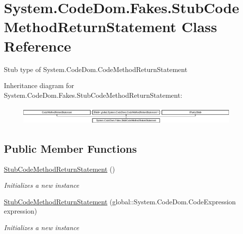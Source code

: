 \hypertarget{class_system_1_1_code_dom_1_1_fakes_1_1_stub_code_method_return_statement}{\section{System.\-Code\-Dom.\-Fakes.\-Stub\-Code\-Method\-Return\-Statement Class Reference}
\label{class_system_1_1_code_dom_1_1_fakes_1_1_stub_code_method_return_statement}
}


Stub type of System.\-Code\-Dom.\-Code\-Method\-Return\-Statement 


Inheritance diagram for System.\-Code\-Dom.\-Fakes.\-Stub\-Code\-Method\-Return\-Statement\-:\begin{figure}[H]
\begin{center}
\leavevmode
\includegraphics[height=0.992908cm]{class_system_1_1_code_dom_1_1_fakes_1_1_stub_code_method_return_statement}
\end{center}
\end{figure}
\subsection*{Public Member Functions}
\begin{DoxyCompactItemize}
\item 
\hyperlink{class_system_1_1_code_dom_1_1_fakes_1_1_stub_code_method_return_statement_ad6aa9fcb84d059ed2327febd18a575d1}{Stub\-Code\-Method\-Return\-Statement} ()
\begin{DoxyCompactList}\small\item\em Initializes a new instance\end{DoxyCompactList}\item 
\hyperlink{class_system_1_1_code_dom_1_1_fakes_1_1_stub_code_method_return_statement_a7436494d9a2673de8d45ecbfde9a5279}{Stub\-Code\-Method\-Return\-Statement} (global\-::\-System.\-Code\-Dom.\-Code\-Expression expression)
\begin{DoxyCompactList}\small\item\em Initializes a new instance\end{DoxyCompactList}\end{DoxyCompactItemize}
